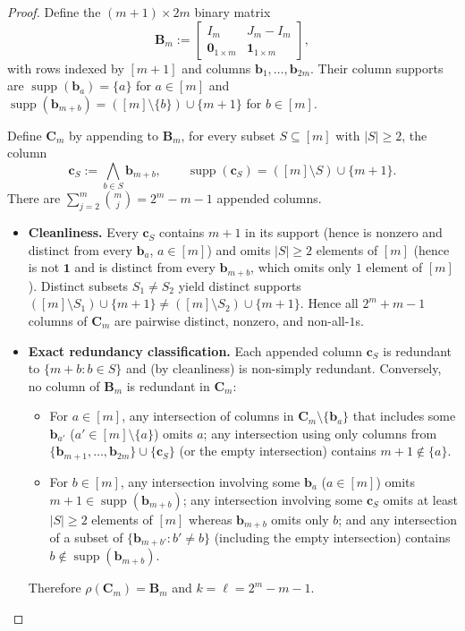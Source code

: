 \documentclass[11pt]{article}
\theoremstyle{plain}
\theoremstyle{definition}
\theoremstyle{remark}
\DeclareMathOperator{\supp}{supp}
\begin{document}
\begin{proof}
Define the $(m+1) \times 2m$ binary matrix
\[
\mathbf{B}_m := \begin{bmatrix} I_m & J_m - I_m \\ \mathbf{0}_{1 \times m} & \mathbf{1}_{1 \times m} \end{bmatrix},
\]
with rows indexed by $[m+1]$ and columns $\mathbf{b}_1, \dots, \mathbf{b}_{2m}$. Their column supports are $\supp(\mathbf{b}_a) = \{a\}$ for $a \in [m]$ and $\supp(\mathbf{b}_{m+b}) = ([m] \setminus \{b\}) \cup \{m+1\}$ for $b \in [m]$.

Define $\mathbf{C}_m$ by appending to $\mathbf{B}_m$, for every subset $S \subseteq [m]$ with $|S| \ge 2$, the column
\[
\mathbf{c}_S := \bigwedge_{b \in S} \mathbf{b}_{m+b}, \qquad \supp(\mathbf{c}_S) = ([m] \setminus S) \cup \{m+1\}.
\]
There are $\sum_{j=2}^m \binom{m}{j} = 2^m - m - 1$ appended columns.

\begin{itemize}[leftmargin=2em]
\item \textbf{Cleanliness.} Every $\mathbf{c}_S$ contains $m+1$ in its support (hence is nonzero and distinct from every $\mathbf{b}_a$, $a \in [m]$) and omits $|S| \ge 2$ elements of $[m]$ (hence is not $\mathbf{1}$ and is distinct from every $\mathbf{b}_{m+b}$, which omits only $1$ element of $[m]$). Distinct subsets $S_1 \neq S_2$ yield distinct supports $([m] \setminus S_1) \cup \{m+1\} \neq ([m] \setminus S_2) \cup \{m+1\}$. Hence all $2^m + m - 1$ columns of $\mathbf{C}_m$ are pairwise distinct, nonzero, and non-all-$1$s.

\item \textbf{Exact redundancy classification.} Each appended column $\mathbf{c}_S$ is redundant to $\{m+b : b \in S\}$ and (by cleanliness) is non-simply redundant. Conversely, no column of $\mathbf{B}_m$ is redundant in $\mathbf{C}_m$:
  \begin{itemize}[leftmargin=1.5em]
  \item For $a \in [m]$, any intersection of columns in $\mathbf{C}_m \setminus \{\mathbf{b}_a\}$ that includes some $\mathbf{b}_{a'}$ ($a' \in [m] \setminus \{a\}$) omits $a$; any intersection using only columns from $\{\mathbf{b}_{m+1}, \dots, \mathbf{b}_{2m}\} \cup \{\mathbf{c}_S\}$ (or the empty intersection) contains $m+1 \notin \{a\}$.
  \item For $b \in [m]$, any intersection involving some $\mathbf{b}_a$ ($a \in [m]$) omits $m+1 \in \supp(\mathbf{b}_{m+b})$; any intersection involving some $\mathbf{c}_S$ omits at least $|S| \ge 2$ elements of $[m]$ whereas $\mathbf{b}_{m+b}$ omits only $b$; and any intersection of a subset of $\{\mathbf{b}_{m+b'} : b' \neq b\}$ (including the empty intersection) contains $b \notin \supp(\mathbf{b}_{m+b})$.
  \end{itemize}
Therefore $\rho(\mathbf{C}_m) = \mathbf{B}_m$ and $k = \ell = 2^m - m - 1$.


\end{itemize}
\end{proof}
\end{document}
